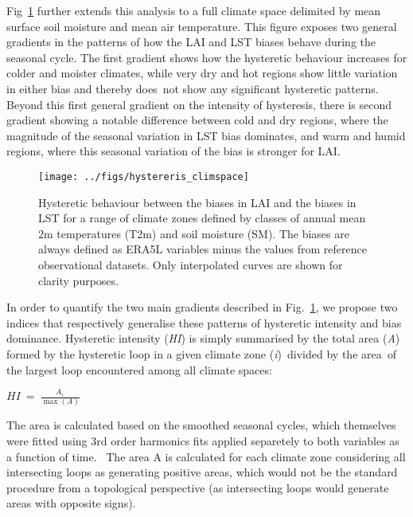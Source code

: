 \documentclass[gmd, manuscript]{copernicus}
\begin{document}
{{Fig~}{\ref{925458}}{ }further extends this analysis to
a full climate space delimited by mean surface soil moisture and mean
air temperature. This figure exposes two general gradients in the
patterns of how the LAI and LST biases behave during the seasonal cycle.
The first gradient shows how the hysteretic behaviour increases for
colder and moister climates, while very dry and hot regions show little
variation in either bias and thereby does~not show any significant
hysteretic patterns. {Beyond this first general gradient on the
intensity of hyste}resis, there is second gradient showing a notable
difference between cold and dry regions, where the magnitude of the
seasonal variation in LST bias dominates, and warm and humid regions,
where this seasonal variation of the bias is stronger for LAI.

\begin{figure}[h]
\begin{center}
\texttt{[image: ../figs/hystereris\_climspace]}
\caption{{Hysteretic behaviour between the biases in LAI and the biases in LST for
a range of climate zones defined by classes of annual mean 2m
temperatures (T2m) and soil moisture (SM). The biases are always defined
as ERA5L variables minus the values from reference observational
datasets. Only interpolated curves are shown for clarity purposes.
{\label{925458}}%
}}
\end{center}
\end{figure}

\par\null

{In order} to quantify the two main gradients described in
Fig.~{\ref{925458}}, we propose two indices that
respectively generalise these patterns of hysteretic intensity and bias
dominance. {{Hysteretic intensity (}}\emph{{HI}}{)} is simply summarised
by the total area (\emph{A}) formed by the hysteretic loop in a given
climate zone (\emph{i})\emph{~}divided by the area\emph{~}of the largest
loop encountered among all climate spaces:

\(HI\ =\ \frac{A_{i\ }}{\max\left(A\right)}\)

The area is calculated based on the smoothed seasonal cycles, which
themselves were fitted using {3rd order harmonics fits applied
separetely to both variables as a function of time}.~ The area A is
calculated for each climate zone considering all intersecting loops as
generating positive areas, which would not be the standard procedure
from a topological perspective (as intersecting loops would generate
areas with opposite signs).

}
\end{document}
